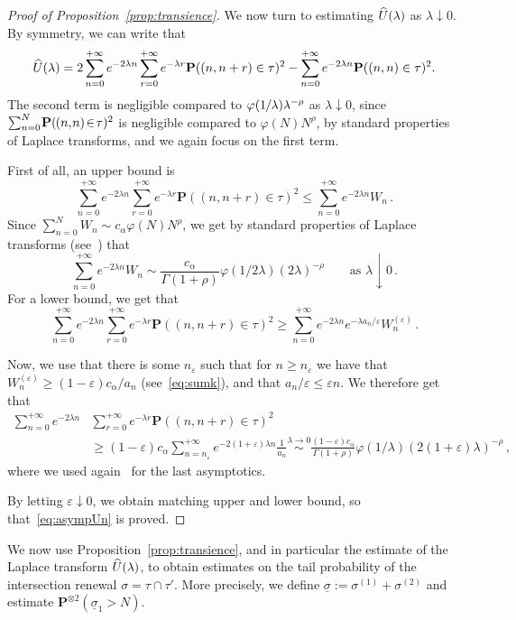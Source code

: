 \documentclass[11pt]{article}
\theoremstyle{definition}
\newenvironment{proofc}{\begin{proof}}{\end{proof}}
\numberwithin{equation}{section}
\numberwithin{figure}{section}
\numberwithin{table}{section}
\newcommand{\ga}{\alpha}
\newcommand{\gep}{\varepsilon}
\newcommand{\gl}{\lambda}
\let\oldhat\hat
\renewcommand*{\hat}[1]{\mathchoice{\widehat{#1}}{\widehat{#1}}{\oldhat{#1}}{\oldhat{#1}}}
\newcommand{\bP}{\ensuremath{\mathbf{P}}}
\newcommand*{\mk}{\mkern -1mu}
\newcommand*{\Mk}{\mkern -2mu}
\begin{document}
\begin{appendix}
\begin{proofc}[Proof of Proposition~\ref{prop:transience}]
We now turn to estimating $\hat U (\gl)$ as $\gl \downarrow 0$. By symmetry, we can write that
\[
\hat U(\gl) = 2\sum_{n=0}^{+\infty} e^{-2 \gl n}\sum_{r=0}^{+\infty} e^{-\gl r} \bP((n,n+r)\in\tau)^2 - \sum_{n=0}^{+\infty} e^{-2\gl n} \bP((n,n)\in\tau)^2.
\]
The second term is negligible compared to $ \varphi(1\mk/\mk\gl) \gl^{-\rho}$ as $\gl \!\downarrow\! 0$, since $\sum_{n=0}^N\Mk \bP(\mk{(n,\Mk n)\!\in\!\tau})^2$ is negligible compared to $ \varphi(N)N^{\rho}$, by standard properties of Laplace transforms, and we again focus on the first term.

First of all, an upper bound is
\[
\sum_{n=0}^{+\infty} e^{-2 \gl n}\sum_{r=0}^{+\infty} e^{-\gl r} \bP((n,n+r)\in\tau)^2 \leq \sum_{n=0}^{+\infty} e^{-2\gl n} W_n\,.
\]
Since $\sum_{n=0}^{N} W_n \sim c_{\ga} \varphi(N)N^{\rho}$, we get by standard properties of Laplace transforms (see~\cite[Corollary~1.7.3]{cf:BGT}) that
\[
\sum_{n=0}^{+\infty} e^{-2\gl n} W_n \sim \frac{c_\ga}{\Gamma(1+\rho)} \varphi(1/2\gl) (2\gl)^{-\rho} \qquad \text{as } \gl \downarrow 0\,.
\]
For a lower bound, we get that
\[
\sum_{n=0}^{+\infty} e^{-2 \gl n}\sum_{r=0}^{+\infty} e^{-\gl r} \bP((n,n+r)\in\tau)^2 \geq \sum_{n=0}^{+\infty} e^{-2\gl n} e^{-\gl a_n /\gep} W_n^{(\gep)}\,.
\]

Now, we use that there is some $n_{\gep}$ such that for $n\geq n_{\gep}$ we have that $W_n^{(\gep)}\geq (1-\gep) c_{\ga} /a_n$ (see~\eqref{eq:sumk}), and that $a_n/\gep \leq \gep n$. We therefore get that
\begin{align*}
\sum_{n=0}^{+\infty} e^{-2 \gl n}&\sum_{r=0}^{+\infty} e^{-\gl r} \bP((n,n+r)\in\tau)^2 \\
& \geq (1-\gep) c_\ga \sum_{n=n_{\gep}}^{+\infty} e^{-2(1+\gep)\gl n} \frac{1}{a_n} \stackrel{\gl\to 0}{\sim} \frac{(1-\gep) c_\ga}{\Gamma(1+\rho)} \varphi(1/\gl) (2(1+\gep) \gl)^{-\rho}\,,
\end{align*}
where we used again~\cite[Corollary~1.7.3]{cf:BGT} for the last asymptotics.

By letting $\gep \downarrow 0$, we obtain matching upper and lower bound, so that~\eqref{eq:asympUn} is proved.
\end{proofc}

We now use Proposition~\ref{prop:transience}, and in particular the estimate of the Laplace transform $\hat U(\gl)$, to obtain estimates on the tail probability of the intersection renewal $\sigma=\tau\cap \tau'$. More precisely, we define $\underline{\sigma}:= \sigma^{(1)} + \sigma^{(2)}$ and estimate $\bP^{\otimes 2}(\underline \sigma _1 >N)$.


\end{appendix}
\end{document}
